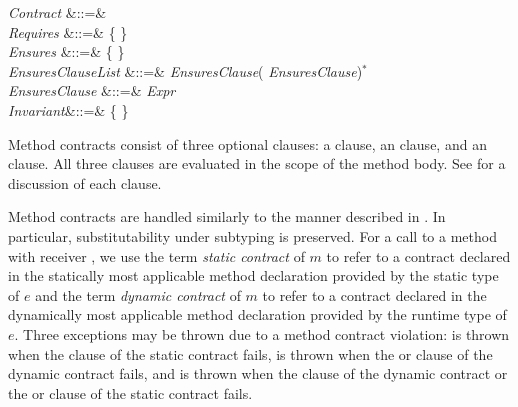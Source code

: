 \begin{Grammar}
\emph{Contract} &::=&  
\\

\emph{Requires} &::=&
 \{  \} \\

\emph{Ensures}  &::=&
 \{  \} \\

\emph{EnsuresClauseList} &::=&
\emph{EnsuresClause}(\EXP{,} \emph{EnsuresClause})$^*$ \\

\emph{EnsuresClause} &::=& \emph{Expr}  \\

\emph{Invariant}&::=&
 \{  \} \\

\end{Grammar}

Method contracts consist of three optional clauses: a 
clause, an  clause, and an  clause.
All three clauses are evaluated in the scope of the method body.
See  for a discussion of each clause.


Method contracts are handled similarly to the manner described in
\cite{MethodContracts}. In particular, substitutability under subtyping is
preserved.  For a call to a method  with receiver ,
we use the term \emph{static contract} of $m$ to refer to
a contract declared in the statically most
applicable method declaration provided by the static type of $e$
and the term \emph{dynamic contract} of $m$ to refer to a contract declared
in the dynamically most applicable method declaration provided by the
runtime type of $e$.
Three exceptions may be thrown due to a method contract
violation:  is thrown when the  clause
of the static contract fails,  is thrown when the
 or  clause of the dynamic contract fails,
and  is thrown
when the  clause of the dynamic contract
or the  or  clause of the static contract fails.


